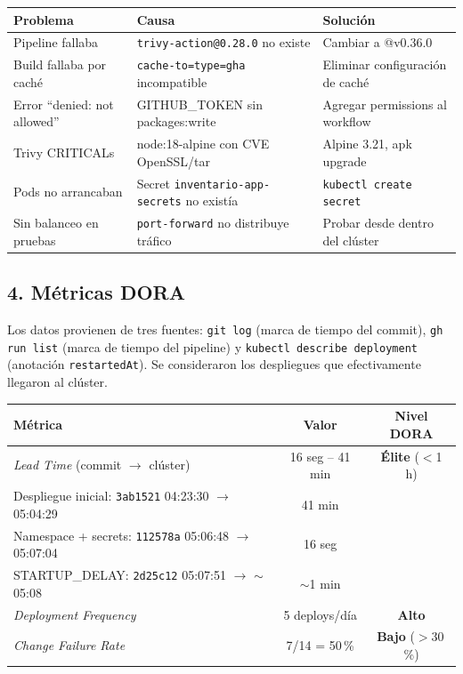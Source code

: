 \documentclass[12pt,a4paper]{article}
\begin{document}
\small
\begin{tabularx}{\textwidth}{p{3cm}p{3.5cm}X}
\toprule
\textbf{Problema} & \textbf{Causa} & \textbf{Soluci\'on} \\
\midrule
Pipeline fallaba & \texttt{trivy-action@0.28.0} no existe & Cambiar a @v0.36.0 \\
Build fallaba por cach\'e & \texttt{cache-to=type=gha} incompatible & Eliminar configuraci\'on de cach\'e \\
Error ``denied: not allowed'' & GITHUB\_TOKEN sin packages:write & Agregar permissions al workflow \\
Trivy CRITICALs & node:18-alpine con CVE OpenSSL/tar & Alpine 3.21, apk upgrade \\
Pods no arrancaban & Secret \texttt{inventario-app-secrets} no exist\'ia & \texttt{kubectl create secret} \\
Sin balanceo en pruebas & \texttt{port-forward} no distribuye tr\'afico & Probar desde dentro del cl\'uster \\
\bottomrule
\end{tabularx}
\normalsize

\subsection*{4. M\'etricas DORA}

Los datos provienen de tres fuentes: \texttt{git log} (marca de tiempo del commit), \texttt{gh run list} (marca de tiempo del pipeline) y \texttt{kubectl describe deployment} (anotaci\'on \texttt{restartedAt}). Se consideraron los despliegues que efectivamente llegaron al cl\'uster.

\small
\begin{tabularx}{\textwidth}{Xcc}
\toprule
\textbf{M\'etrica} & \textbf{Valor} & \textbf{Nivel DORA} \\
\midrule
\textit{Lead Time} (commit $\rightarrow$ cl\'uster) & 16 seg -- 41 min & \textbf{\'Elite} ($<$1 h) \\
Despliegue inicial: \texttt{3ab1521} 04:23:30 $\rightarrow$ 05:04:29 & 41 min & \\
Namespace + secrets: \texttt{112578a} 05:06:48 $\rightarrow$ 05:07:04 & 16 seg & \\
STARTUP\_DELAY: \texttt{2d25c12} 05:07:51 $\rightarrow$ $\sim$05:08 & $\sim$1 min & \\
\midrule
\textit{Deployment Frequency} & 5 deploys/d\'ia & \textbf{Alto} \\
\midrule
\textit{Change Failure Rate} & 7/14 = 50\,\% & \textbf{Bajo} ($>$30\,\%) \\
\bottomrule
\end{tabularx}
\normalsize
\end{document}
